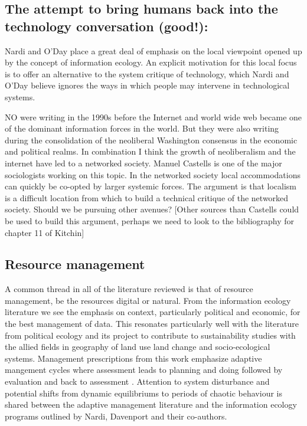 \subsection{The attempt to bring humans back into the technology conversation (good!):}

Nardi and O'Day place a great deal of emphasis on the local viewpoint opened up by the concept of information ecology. An explicit motivation for this local focus is to offer an alternative to the system critique of technology, which Nardi and O'Day believe ignores the ways in which people may intervene in technological systems.

NO were writing in the 1990s before the Internet and world wide web became one of the dominant information forces in the world. But they were also writing during the consolidation of the neoliberal Washington consensus in the economic and political realms. In combination I think the growth of neoliberalism and the internet have led to a networked society. Manuel Castells is one of the major sociologists working on this topic. In the networked society local accommodations can quickly be co-opted by larger systemic forces. The argument is that localism is a difficult location from which to build a technical critique of the networked society. Should we be pursuing other avenues? [Other sources than Castells could be used to build this argument, perhaps we need to look to the bibliography for chapter 11 of Kitchin]

\subsection{Resource management}

A common thread in all of the literature reviewed is that of resource management, be the resources digital or natural. From the information ecology literature we see the emphasis on context, particularly political and economic, for the best management of data. This resonates particularly well with the literature from political ecology and its project to contribute to sustainability studies with the allied fields in geography of land use land change and socio-ecological systems. Management prescriptions from this work emphasize adaptive mangement cycles where assessment leads to planning and doing followed by evaluation and back to assessment \citep{holling_1978,liu_etal_2007}. Attention to system disturbance and potential shifts from dynamic equilibriums to periods of chaotic behaviour is shared between the adaptive management literature and the information ecology programs outlined by Nardi, Davenport and their co-authors. 

